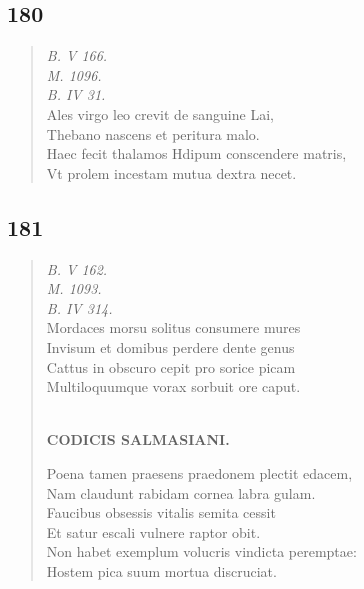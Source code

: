\documentclass[11pt, a4paper]{report}
\begin{document}
            \subsection*{180}
      \begin{verse}
      \textit{B. V 166.} \\ \textit{M. 1096.} \\ \textit{B. IV 31.} \\ Ales virgo leo crevit de sanguine Lai, \\ Thebano nascens et peritura malo. \\ Haec fecit thalamos Hdipum conscendere matris, \\ Vt prolem incestam mutua dextra necet. \\ 
      \end{verse}
  
            \subsection*{181}
      \begin{verse}
      \textit{B. V 162.} \\ \textit{M. 1093.} \\ \textit{B. IV 314.} \\ Mordaces morsu solitus consumere mures \\ Invisum et domibus perdere dente genus \\ Cattus in obscuro cepit pro sorice picam \\ Multiloquumque vorax sorbuit ore caput. \\ 
        ﻿\pagebreak 
    \begin{center} \textbf{CODICIS SALMASIANI.} \end{center} \marginpar{[155]} Poena tamen praesens praedonem plectit edacem, \\ Nam claudunt rabidam cornea labra gulam. \\ Faucibus obsessis vitalis semita cessit \\ Et satur escali vulnere raptor obit. \\ Non habet exemplum volucris vindicta peremptae: \\ Hostem pica suum mortua discruciat. \\ 
      \end{verse}
  
\end{document}
